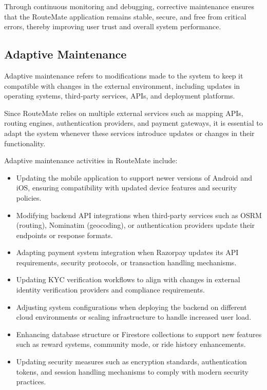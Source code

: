 \documentclass[10pt,a4paper]{report}
\begin{document}
\justify\large Through continuous monitoring and debugging, corrective maintenance ensures that the RouteMate application remains stable, secure, and free from critical errors, thereby improving user trust and overall system performance.

\subsection{Adaptive Maintenance}

\justify\large Adaptive maintenance refers to modifications made to the system to keep it compatible with changes in the external environment, including updates in operating systems, third-party services, APIs, and deployment platforms.

\justify\large Since RouteMate relies on multiple external services such as mapping APIs, routing engines, authentication providers, and payment gateways, it is essential to adapt the system whenever these services introduce updates or changes in their functionality.

\justify\large Adaptive maintenance activities in RouteMate include:

\begin{itemize}

\item Updating the mobile application to support newer versions of Android and iOS, ensuring compatibility with updated device features and security policies.

\item Modifying backend API integrations when third-party services such as OSRM (routing), Nominatim (geocoding), or authentication providers update their endpoints or response formats.

\item Adapting payment system integration when Razorpay updates its API requirements, security protocols, or transaction handling mechanisms.

\item Updating KYC verification workflows to align with changes in external identity verification providers and compliance requirements.

\item Adjusting system configurations when deploying the backend on different cloud environments or scaling infrastructure to handle increased user load.

\item Enhancing database structure or Firestore collections to support new features such as reward systems, community mode, or ride history enhancements.

\item Updating security measures such as encryption standards, authentication tokens, and session handling mechanisms to comply with modern security practices.

\end{itemize}
\end{document}
